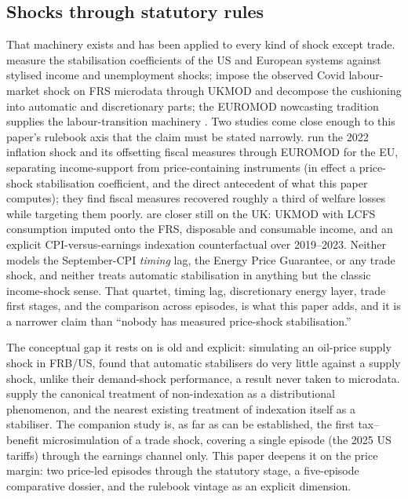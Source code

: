 \subsection{Shocks through statutory rules}

That machinery exists and has been applied to every kind of shock
except trade. \citet{dolls2012} measure the stabilisation coefficients
of the US and European systems against stylised income and unemployment
shocks; \citet{brewertasseva2021} impose the observed Covid
labour-market shock on FRS microdata through UKMOD and decompose the
cushioning into automatic and discretionary parts; the EUROMOD
nowcasting tradition supplies the labour-transition machinery
\citep{navicke2014}. Two studies come close enough to this paper's rulebook axis that the
claim must be stated narrowly. \citet{amores2025} run the 2022
inflation shock and its offsetting fiscal measures through EUROMOD for
the EU, separating income-support from price-containing instruments
(in effect a price-shock stabilisation coefficient, and the direct
antecedent of what this paper computes); they find fiscal measures
recovered roughly a third of welfare losses while targeting them
poorly. \citet{popova2026} are closer still on the UK: UKMOD with LCFS
consumption imputed onto the FRS, disposable and consumable income, and
an explicit CPI-versus-earnings indexation counterfactual over
2019--2023. Neither models the September-CPI \emph{timing} lag, the
Energy Price Guarantee, or any trade shock, and neither treats
automatic stabilisation in anything but the classic income-shock
sense. That quartet, timing lag, discretionary energy layer, trade
first stages, and the comparison across episodes, is what this paper
adds, and it is a narrower claim than ``nobody has measured price-shock
stabilisation.''

The conceptual gap it rests on is old and explicit: simulating an
oil-price supply shock in FRB/US, \citet{cohenfollette2000} found that
automatic stabilisers do very little against a supply shock, unlike
their demand-shock performance, a result never taken to microdata. \citet{paulus2020} supply the canonical treatment of
non-indexation as a distributional phenomenon, and
\citet{leventi2024} the nearest existing treatment of indexation
itself as a stabiliser. The companion study
\citep{ahmadi2026} is, as far as can be established, the first
tax--benefit microsimulation of a trade shock, covering a single
episode (the 2025 US tariffs) through the earnings channel only. This paper deepens it on the price
margin: two price-led episodes through the statutory stage, a
five-episode comparative dossier, and the rulebook vintage as an
explicit dimension.


